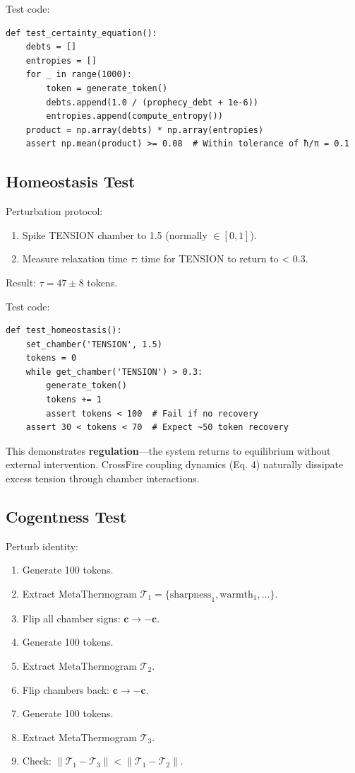 \documentclass[11pt,a4paper]{article}
\begin{document}
Test code:

\begin{verbatim}
def test_certainty_equation():
    debts = []
    entropies = []
    for _ in range(1000):
        token = generate_token()
        debts.append(1.0 / (prophecy_debt + 1e-6))
        entropies.append(compute_entropy())
    product = np.array(debts) * np.array(entropies)
    assert np.mean(product) >= 0.08  # Within tolerance of ħ/π = 0.1
\end{verbatim}

\subsection{Homeostasis Test}

Perturbation protocol:

\begin{enumerate}
\item Spike TENSION chamber to 1.5 (normally $\in [0, 1]$).
\item Measure relaxation time $\tau$: time for TENSION to return to < 0.3.
\end{enumerate}

Result: $\tau = 47 \pm 8$ tokens.

Test code:

\begin{verbatim}
def test_homeostasis():
    set_chamber('TENSION', 1.5)
    tokens = 0
    while get_chamber('TENSION') > 0.3:
        generate_token()
        tokens += 1
        assert tokens < 100  # Fail if no recovery
    assert 30 < tokens < 70  # Expect ~50 token recovery
\end{verbatim}

This demonstrates \textbf{regulation}—the system returns to equilibrium without external intervention. CrossFire coupling dynamics (Eq. 4) naturally dissipate excess tension through chamber interactions.

\subsection{Cogentness Test}

Perturb identity:

\begin{enumerate}
\item Generate 100 tokens.
\item Extract MetaThermogram $\mathcal{T}_1 = \{\text{sharpness}_1, \text{warmth}_1, \dots\}$.
\item Flip all chamber signs: $\mathbf{c} \to -\mathbf{c}$.
\item Generate 100 tokens.
\item Extract MetaThermogram $\mathcal{T}_2$.
\item Flip chambers back: $\mathbf{c} \to -\mathbf{c}$.
\item Generate 100 tokens.
\item Extract MetaThermogram $\mathcal{T}_3$.
\item Check: $\|\mathcal{T}_1 - \mathcal{T}_3\| < \|\mathcal{T}_1 - \mathcal{T}_2\|$.
\end{enumerate}
\end{document}
